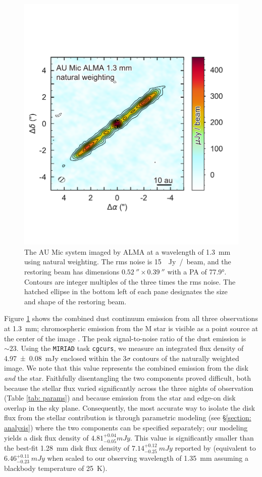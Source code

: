 \documentclass[modern]{aastex62}
\begin{document}
\begin{figure}
    \centering
    \includegraphics[width=0.8\linewidth]{../figures/aumic_imaged}
    \caption{The AU Mic system imaged by ALMA at a wavelength of \SI{1.3}{mm} using natural weighting. 
    The rms noise is \SI{15}{\mu Jy / beam}, and the restoring beam has dimensions $\SI{0.52}{\arcsecond} \times \SI{0.39}{\arcsecond}$ with a PA of \ang[angle-symbol-over-decimal]{77.9}.
    Contours are integer multiples of the three times the rms noise.
    The hatched ellipse in the bottom left of each pane designates the size and shape of the restoring beam.
    }
    \label{fig: aumic_imaged}
\end{figure}

Figure \ref{fig: aumic_imaged} shows the combined dust continuum emission from all three observations at \SI{1.3}{mm}; chromospheric emission from the M star is visible as a point source at the center of the image \citep{cranmer13}. 
The peak signal-to-noise ratio of the dust emission is $\sim 23$.
Using the \texttt{MIRIAD} \citep{sault95} task \texttt{cgcurs}, we measure an integrated flux density of \SI{4.97 \pm 0.08}{\milli Jy} enclosed within the $3\sigma$ contours of the naturally weighted image.  
We note that this value represents the combined emission from the disk \textit{and} the star. 
Faithfully disentangling the two components proved difficult, both because the stellar flux varied significantly across the three nights of observation (Table \ref{tab: params}) and because emission from the star and edge-on disk overlap in the sky plane.
Consequently, the most accurate way to isolate the disk flux from the stellar contribution is through parametric modeling (see \S \ref{section: analysis}) where the two components can be specified separately; our modeling yields a disk flux density of $4.81 ^{+0.04} _{-0.05} \si{mJy}$.
This value is significantly smaller than the best-fit \SI{1.28}{mm} disk flux density of $7.14^{+0.12}_{-0.25}~\si{mJy}$ reported by \citet{macgregor13} (equivalent to $6.46^{+0.11}_{-0.23}~\si{mJy}$ when scaled to our observing wavelength of \SI{1.35}{mm} assuming a blackbody temperature of \SI{25}{K}).
\end{document}
